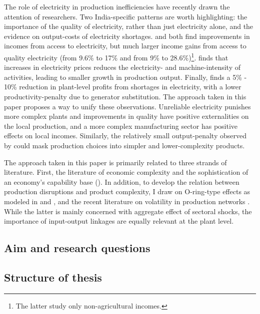 \documentclass[11pt]{article}
\begin{document}
The role of electricity in production inefficiencies have recently drawn the attention of researchers. Two India-specific patterns are worth highlighting: the importance of the quality of electricity, rather than just electricity alone, and the evidence on output-costs of electricity shortages. \cite{samad_benefits_2016} and \cite{chakravorty_does_2014} both find improvements in incomes from access to electricity, but much larger income gains from access to quality electricity (from 9.6\% to 17\% and from 9\% to 28.6\%)\footnote{The latter study only non-agricultural incomes.}. \cite{abeberese_electricity_2017} finds that increases in electricity prices reduces the electricity- and machine-intensity of activities, leading to smaller growth in production output. Finally, \cite{allcott_how_2016} finds a 5\% - 10\% reduction in plant-level profits from shortages in electricity, with a lower productivity-penalty due to generator substitution. The approach taken in this paper proposes a way to unify these observations. Unreliable electricity punishes more complex plants and improvements in quality have positive externalities on the local production, and a more complex manufacturing sector has positive effects on local incomes. Similarly, the relatively small output-penalty observed by \cite{allcott_how_2016} could mask production choices into simpler and lower-complexity products.

The approach taken in this paper is primarily related to three strands of literature. First, the literature of economic complexity and the sophistication of an economy's capability base  (\citealp{frenken_related_2007,hausmann_atlas_2013,tacchella_new_2012}). In addition, to develop the relation between production disruptions and product complexity, I draw on O-ring-type effects as modeled in \cite{kremer_o-ring_1993} and \cite{jones_intermediate_2011}, and the recent literature on volatility in production networks \citep{acemoglu_network_2012}. While the latter is mainly concerned with aggregate effect of sectoral shocks, the importance of input-output linkages are equally relevant at the plant level.

\subsection{Aim and research questions}%
\label{sub:aim_and_research_questions}

\subsection{Structure of thesis}%
\label{sub:structure_of_thesis}
\end{document}
